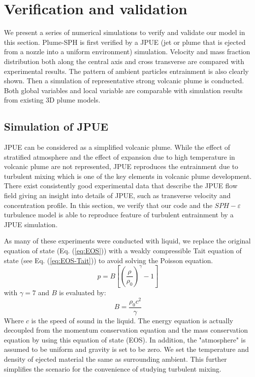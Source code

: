 \documentclass[journal abbreviation, manuscript]{copernicus}
\begin{document}
\section{Verification and validation} \label{sec:verification-validation}
We present a series of numerical simulations to verify and validate our model in this section. Plume-SPH is first verified by a JPUE (jet or plume that is ejected from a nozzle into a uniform environment) simulation. Velocity and mass fraction distribution both along the central axis and cross transverse are compared with experimental results. The pattern of ambient particles entrainment is also clearly shown. Then a simulation of representative strong volcanic plume is conducted. Both global variables and local variable are comparable with simulation results from existing 3D plume models.
\subsection{Simulation of JPUE}
JPUE can be considered as a simplified volcanic plume. While the effect of stratified atmosphere and the effect of expansion due to high temperature in volcanic plume are not represented, JPUE reproduces the entrainment due to turbulent mixing which is one of the key elements in volcanic plume development. There exist consistently good experimental data \citep { list1982turbulent,dimotakis1983structure, papanicolaou1988investigations} that describe the JPUE flow field giving an insight into details of JPUE, such as transverse velocity and concentration profile. In this section, we verify that our code and the $SPH-\varepsilon$ turbulence model is able to reproduce feature of turbulent entrainment by a JPUE simulation.

As many of these experiments were conducted with liquid, we replace the original equation of state (Eq. (\ref{eq:EOS})) with a weakly compressible Tait equation of state \citep {becker2007weakly} (see Eq. (\ref{eq:EOS-Tait})) to avoid solving the Poisson equation.
\begin{equation}
p=B\left[\left(\dfrac{\rho}{\rho_0}\right)^{\gamma}-1\right]
\label{eq:EOS-Tait}
\end{equation}
with $\gamma=7$ and $B$ is evaluated by:
\begin{equation}
B=\dfrac{\rho_0 c^2}{\gamma}
\end{equation}
Where $c$ is the speed of sound in the liquid. The energy equation is actually decoupled from the momentum conservation equation and the mass conservation equation by using this equation of state (EOS). In addition, the "atmosphere" is assumed to be uniform and gravity is set to be zero. We set the temperature and density of ejected material the same as surrounding ambient. This further simplifies the scenario for the convenience of studying turbulent mixing. 
\end{document}
